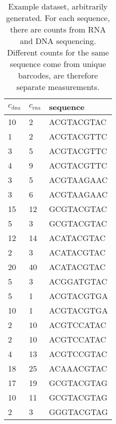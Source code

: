 \begin{table}[]
    \centering
    \begin{tabular}{|l|l|l|}
    \hline
    $c_{\mathrm{dna}}$ & $c_{\mathrm{rna}}$ & sequence         \\ \hline
    10               & 2                & ACGTACGTAC\\ \hline
    1                & 2                & ACGTACGTTC\\ \hline
    3                & 5                & ACGTACGTTC\\ \hline
    4                & 9                & ACGTACGTTC\\ \hline
    3                & 5                & ACGTAAGAAC\\ \hline
    3                & 6                & ACGTAAGAAC\\ \hline
    15               & 12               & GCGTACGTAC\\ \hline
    5                 &3                & GCGTACGTAC\\ \hline
    12               & 14               & ACATACGTAC\\ \hline
    2                & 3                & ACATACGTAC\\ \hline
    20               & 40               & ACATACGTAC\\ \hline
    5                & 3                & ACGGATGTAC\\ \hline
    5                & 1                & ACGTACGTGA\\ \hline
    10               & 1                & ACGTACGTGA\\ \hline
    2                & 10               & ACGTCCATAC\\ \hline
    2                & 10               & ACGTCCATAC\\ \hline
    4                & 13               & ACGTCCGTAC\\ \hline
    18               & 25               & ACAAACGTAC\\ \hline
    17               & 19               & GCGTACGTAG\\ \hline
    10               & 11               & GCGTACGTAG\\ \hline
    2                & 3                & GGGTACGTAG\\ \hline    \end{tabular}
    \caption{Example dataset, arbitrarily generated. For each sequence, there are counts from RNA and DNA sequencing. Different counts for the same sequence come from unique barcodes, are therefore separate measurements. }
    \label{tab:example_data}
\end{table}
